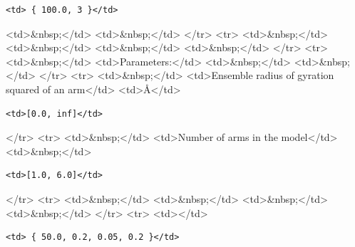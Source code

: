 \begin{verbatim}
<td> { 100.0, 3 }</td>
\end{verbatim}

\textless{}td\textgreater{}\&nbsp;\textless{}/td\textgreater{} \textless{}td\textgreater{}\&nbsp;\textless{}/td\textgreater{} \textless{}/tr\textgreater{} \textless{}tr\textgreater{} \textless{}td\textgreater{}\&nbsp;\textless{}/td\textgreater{} \textless{}td\textgreater{}\&nbsp;\textless{}/td\textgreater{} \textless{}td\textgreater{}\&nbsp;\textless{}/td\textgreater{} \textless{}td\textgreater{}\&nbsp;\textless{}/td\textgreater{} \textless{}/tr\textgreater{} \textless{}tr\textgreater{} \textless{}td\textgreater{}\&nbsp;\textless{}/td\textgreater{} \textless{}td\textgreater{}Parameters:\textless{}/td\textgreater{} \textless{}td\textgreater{}\&nbsp;\textless{}/td\textgreater{} \textless{}td\textgreater{}\&nbsp;\textless{}/td\textgreater{} \textless{}/tr\textgreater{} \textless{}tr\textgreater{} \textless{}td\textgreater{}\&nbsp;\textless{}/td\textgreater{} \textless{}td\textgreater{}Ensemble radius of gyration squared of an arm\textless{}/td\textgreater{} \textless{}td\textgreater{}\AA{}\textless{}/td\textgreater{}

\begin{verbatim}
<td>[0.0, inf]</td>
\end{verbatim}

\textless{}/tr\textgreater{} \textless{}tr\textgreater{} \textless{}td\textgreater{}\&nbsp;\textless{}/td\textgreater{} \textless{}td\textgreater{}Number of arms in the model\textless{}/td\textgreater{} \textless{}td\textgreater{}\&nbsp;\textless{}/td\textgreater{}

\begin{verbatim}
<td>[1.0, 6.0]</td>
\end{verbatim}

\textless{}/tr\textgreater{} \textless{}tr\textgreater{} \textless{}td\textgreater{}\&nbsp;\textless{}/td\textgreater{} \textless{}td\textgreater{}\&nbsp;\textless{}/td\textgreater{} \textless{}td\textgreater{}\&nbsp;\textless{}/td\textgreater{} \textless{}td\textgreater{}\&nbsp;\textless{}/td\textgreater{} \textless{}/tr\textgreater{} \textless{}tr\textgreater{} \textless{}td\textgreater{}\textless{}/td\textgreater{}

\begin{verbatim}
<td> { 50.0, 0.2, 0.05, 0.2 }</td>
\end{verbatim}

